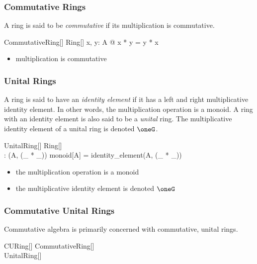\documentclass{amsart}
\begin{document}
\subsubsection{Commutative Rings}

A ring is said to be \textit{commutative} if its multiplication is commutative.

\begin{schema}{CommutativeRing}[\genT]
	Ring[\genT]
\where
	\forall x, y: A @ x * y = y * x
\end{schema}

\begin{itemize}
	\item multiplication is commutative
\end{itemize}

\subsubsection{Unital Rings}

A ring is said to have an \textit{identity element} if it has a left and right multiplicative identity element.
In other words, the multiplication operation is a monoid.
A ring with an identity element is also said to be a \textit{unital} ring.
The multiplicative identity element of a unital ring is denoted $\oneG$.

\begin{schema}{UnitalRing}[\genT]
	Ring[\genT]\\
	\oneG: \genT
\where
	(A, (\_ * \_)) \in monoid[A]
\also
	\oneG = identity\_element(A, (\_ * \_))
\end{schema}

\begin{itemize}
	\item the multiplication operation is a monoid
	\item the multiplicative identity element is denoted $\oneG$
\end{itemize}

\subsubsection{Commutative Unital Rings}

Commutative algebra is primarily concerned with commutative, unital rings.

\begin{schema}{CURing}[\genT]
	CommutativeRing[\genT] \\
	UnitalRing[\genT]
\end{schema}
\end{document}
